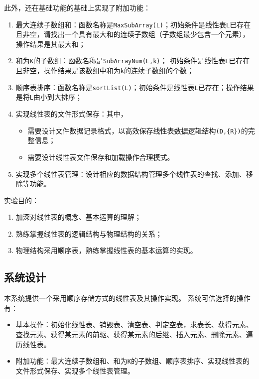 \documentclass[supercite]{Experimental_Report}
\theoremstyle{definition}
\begin{document}
此外，还在基础功能的基础上实现了附加功能：
\begin{enumerate}

	\item 最大连续子数组和：函数名称是\verb|MaxSubArray(L)|；初始条件是线性表\verb|L|已存在且非空，请找出一个具有最大和的连续子数组（子数组最少包含一个元素），操作结果是其最大和；


	\item 和为\verb|K|的子数组：函数名称是\verb|SubArrayNum(L,k)|； 初始条件是线性表\verb|L|已存在且非空，操作结果是该数组中和为\verb|k|的连续子数组的个数；


	\item 顺序表排序：函数名称是\verb|sortList(L)|；初始条件是线性表\verb|L|已存在；操作结果是将\verb|L|由小到大排序；

	\item 实现线性表的文件形式保存：其中，
	\begin{itemize}
		\item 需要设计文件数据记录格式，以高效保存线性表数据逻辑结构\verb|(D,{R})|的完整信息；
		\item  需要设计线性表文件保存和加载操作合理模式。
	\end{itemize}

	\item 实现多个线性表管理：设计相应的数据结构管理多个线性表的查找、添加、移除等功能。
\end{enumerate}
实验目的：
\begin{enumerate}
	\item 加深对线性表的概念、基本运算的理解；
	\item 熟练掌握线性表的逻辑结构与物理结构的关系；
	\item 物理结构采用顺序表，熟练掌握线性表的基本运算的实现。
\end{enumerate}

\subsection{系统设计}
本系统提供一个采用顺序存储方式的线性表及其操作实现。
系统可供选择的操作有：
\begin{itemize}
	\item 基本操作：初始化线性表、销毁表、清空表、判定空表，求表长、获得元素、查找元素、获得某元素的前驱、获得某元素的后继、插入元素、删除元素、遍历线性表。
	\item 附加功能：最大连续子数组和、和为\verb|K|的子数组、顺序表排序、实现线性表的文件形式保存、实现多个线性表管理。
\end{itemize}
\end{document}
